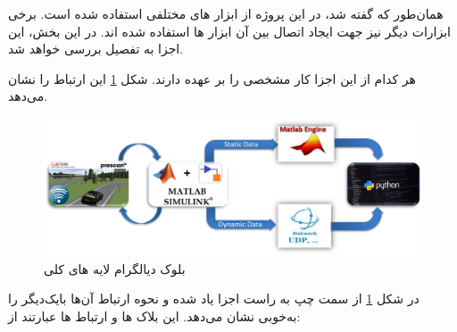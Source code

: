 همان‌طور که گفته شد، در این پروژه از ابزار های مختلفی استفاده شده است. برخی ابزارات دیگر نیز جهت ایجاد اتصال بین آن ابزار ها استفاده شده اند. در این بخش، این اجزا به تفصیل بررسی خواهد شد.

هر کدام از این اجزا کار مشخصی را بر عهده دارند.
شکل  
\ref{fig:block-diagram2}
این ارتباط را نشان می‌دهد.

\begin{figure}[h!]
	\centering
	\includegraphics[width=1\linewidth]{Figures/block-diagram-white}
	\caption{بلوک دیالگرام لایه های کلی}
	\label{fig:block-diagram2}
\end{figure}

در شکل 
\ref{fig:block-diagram2}
از سمت چپ به راست اجزا یاد شده و نحوه ارتباط آن‌ها با‌یک‌دیگر را به‌خوبی نشان می‌دهد. این بلاک ها و ارتباط ها عبارتند از:

